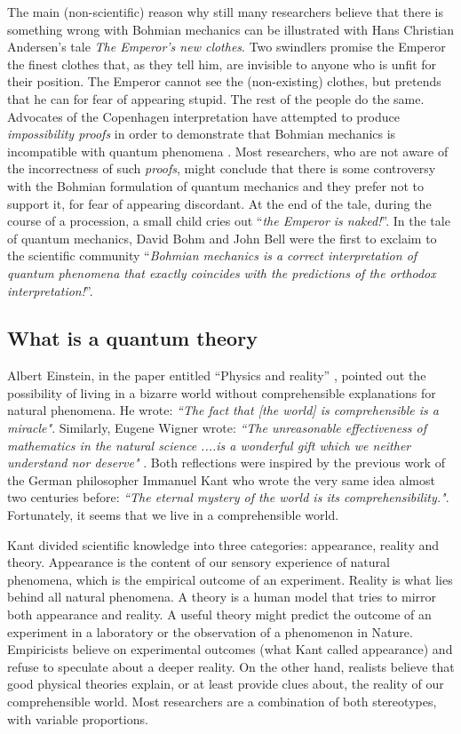 \documentclass[nofootinbib, secnumarabic, amsmath, nobibnotes,11pt,aps,pra, floatfix]{revtex4-1}
\begin{document}
The main (non-scientific) reason why still many researchers believe that there is something wrong with Bohmian mechanics can be illustrated with Hans Christian Andersen's tale \emph{The Emperor's new clothes}. Two swindlers promise the Emperor the finest clothes that, as they tell him,  are invisible to anyone who is unfit for their position. The Emperor cannot see the (non-existing) clothes, but pretends that he can for fear of appearing stupid.  The rest of the people do the same. Advocates of the Copenhagen interpretation have attempted to produce \emph{impossibility proofs} in order to demonstrate that Bohmian mechanics is incompatible with quantum phenomena \cite{om.impossibility_proofs}. Most researchers, who are not aware of the incorrectness of such \emph{proofs}, might conclude that there is some controversy with the Bohmian formulation of quantum mechanics and they prefer not to support it, for fear of appearing discordant. At the end of the tale, during the course of a procession, a small child cries out ``\textit{the Emperor is naked!}''. In the tale of quantum mechanics, David Bohm \cite{om.bohm1952a,om.bohm1952b} and John Bell \cite{om.Bell1987} were the first to exclaim to the scientific community ``\textit{Bohmian mechanics is a correct interpretation of quantum phenomena that exactly coincides with the predictions of the orthodox interpretation!}''.


\subsection{What is a quantum theory}
\label{sec_onto}

Albert Einstein, in the paper entitled ``Physics and reality'' \cite{einstein}, pointed out the possibility of living in a bizarre world without comprehensible explanations for natural phenomena. He wrote: \emph{``The fact that [the world] is comprehensible is a miracle"}. Similarly, Eugene Wigner wrote: \emph{``The unreasonable effectiveness of mathematics in the natural science ....is a wonderful gift which we neither understand nor deserve"} \cite{wigner}. Both reflections were inspired by the previous work of the German philosopher Immanuel Kant who wrote the very same idea almost two centuries before: \emph{``The eternal mystery of the world is its comprehensibility."}. Fortunately, it seems that we  live in a comprehensible world.

Kant divided scientific knowledge into three  categories: appearance, reality and theory. Appearance is the content of our sensory experience of natural phenomena, which is the empirical outcome of an experiment. Reality is what lies behind all natural phenomena. A theory is a human model that tries to mirror both appearance and reality. A useful theory might predict the outcome of an experiment in a laboratory or the observation of a phenomenon in Nature. Empiricists believe on experimental outcomes (what Kant called appearance) and refuse to speculate about a deeper reality. On the other hand, realists believe that good physical theories explain, or at least provide clues about, the reality of our comprehensible world. Most researchers are a combination of both stereotypes, with variable proportions.
\end{document}
